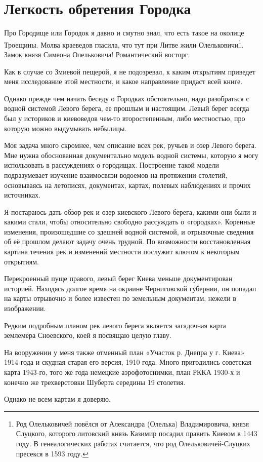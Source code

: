 \chapter{Легкость обретения Городка}


Про Городище или Городок я давно и смутно знал, что есть такое на околице Троещины. Молва краеведов гласила, что тут при Литве жили Олельковичи\footnote{Род Олельковичей повёлся от Александра (Олелька) Владимировича, князя Слуцкого, которого литовский князь Казимир посадил править Киевом в 1443 году. В генеалогических работах считается, что род Олельковичей-Слуцких пресекся в 1593 году.}. Замок князя Симеона Олельковича! Романтический восторг.

Как в случае со Змиевой пещерой, я не подозревал, к каким открытиям приведет меня исследование этой местности, и какое направление придаст всей книге.

Однако прежде чем начать беседу о Городках обстоятельно, надо разобраться с водной системой Левого берега, ее прошлым и настоящим. Левый берег всегда был у историков и киевоведов чем-то второстепенным, либо местностью, про которую можно выдумывать небылицы. 

Моя задача много скромнее, чем описание всех рек, ручьев и озер Левого берега. Мне нужна обоснованная документально модель водной системы, которую я могу использовать в рассуждениях о городищах. Построение такой модели подразумевает изучение взаимосвязи водоемов на протяжении столетий, основываясь на летописях, документах, картах, полевых наблюдениях и прочих источниках.

Я постараюсь дать обзор рек и озер киевского Левого берега, какими они были и какими стали, чтобы относительно свободно рассуждать о «городках». Коренные изменения, произошедшие со здешней водной системой, и отрывочные сведения об её прошлом делают задачу очень трудной. По возможности восстановленная картина течения рек и изменений местности послужит ключом к некоторым открытиям.

Перекроенный пуще правого, левый берег Киева меньше документирован историей. Находясь долгое время на окраине Черниговской губернии, он попадал на карты отрывочно и более известен по земельным документам, нежели в изображении. 

Редким подробным планом рек левого берега является загадочная карта землемера Сноевского, коей я посвящаю целую главу.

На вооружении у меня также отменный план «Участок р. Днепра у г. Киева» 1914 года и скудная старая его версия, 1910 года. Много пригодились советская карта 1943-го, того же года немецкие аэрофотоснимки, план РККА 1930-х и конечно же трехверстовки Шуберта середины 19 столетия.

Однако не всем картам я доверяю.

